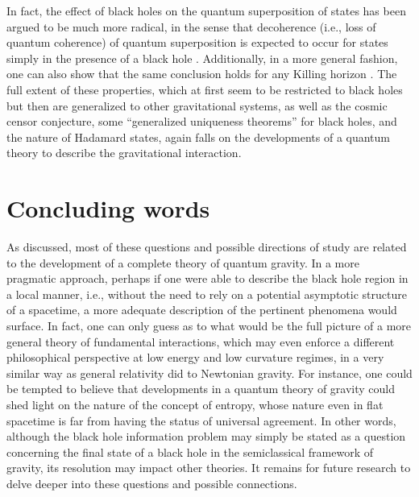 \documentclass[
12pt,		%
openright,	%
twoside,  %
a4paper,			%
chapter=TITLE,		%
english,			%
french,				%
spanish,			%
brazil				%
]{USPSC-classe/USPSC}
\begin{document}
In fact, the effect of black holes on the quantum superposition of states has been argued to be much more radical, in the sense that decoherence (i.e., loss of quantum coherence) of quantum superposition is expected to occur for states simply in the presence of a black hole \cite{Danielson2022}. Additionally, in a more general fashion, one can also show that the same conclusion holds for any Killing horizon \cite{Danielson2023}. The full extent of these properties, which at first seem to be restricted to black holes but then are generalized to other gravitational systems, as well as the cosmic censor conjecture, some ``generalized uniqueness theorems'' for black holes, and the nature of Hadamard states, again falls on the developments of a quantum theory to describe the gravitational interaction.


\section{Concluding words}

As discussed, most of these questions and possible directions of study are related to the development of a complete theory of quantum gravity. In a more pragmatic approach, perhaps if one were able to describe the black hole region in a local manner, i.e., without the need to rely on a potential asymptotic structure of a spacetime, a more adequate description of the pertinent phenomena would surface. 
In fact, one can only guess as to what would be the full picture of a more general theory of fundamental interactions, which may even enforce a different philosophical perspective at low energy and low curvature regimes, in a very similar way as general relativity did to Newtonian gravity. For instance, one could be tempted to believe that developments in a quantum theory of gravity could shed light on the nature of the concept of entropy, whose nature even in flat spacetime is far from having the status of universal agreement. In other words, although the black hole information problem may simply be stated as a question concerning the final state of a black hole in the semiclassical framework of gravity, its resolution may impact other theories. It remains for future research to delve deeper into these questions and possible connections. 


\postextual


\end{document}
